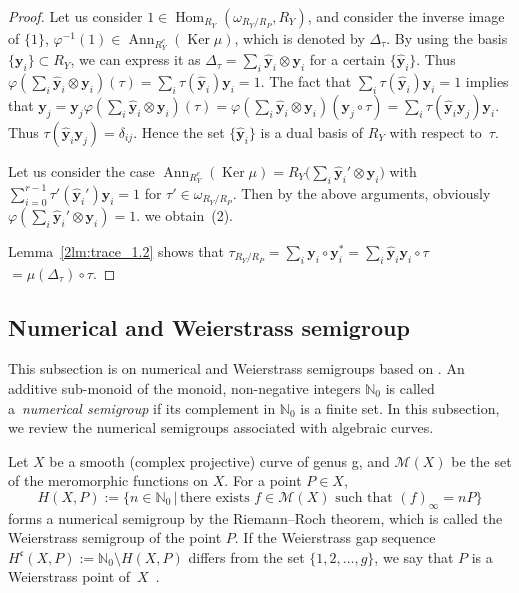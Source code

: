 \documentclass[pdftex]{sigma}
\def\NN{{\mathbb N}}
\def\bby{{\mathbf y}}
\def\cM{{\mathcal M}}
\def\fc{{\mathfrak c}}
\def\hby{\widehat {{\mathbf y}}}
\def\Ker{\operatorname{Ker}}
\numberwithin{equation}{section}
\begin{document}
\begin{proof}Let us consider $1 \in \operatorname{Hom}_{R_Y}(\omega_{R_Y/R_P}, R_Y)$, and consider the inverse image of $\{1\}$, $\varphi^{-1}(1)\in \operatorname{Ann}_{R_Y^e}(\Ker \mu)$, which is denoted by $\Delta_\tau$. By using the basis $\{\bby_i\} \subset R_Y$, we can express it as $\Delta_\tau=\sum_{i}\hby_i \otimes \bby_i$ for a certain $\{\hby_i\}$.
Thus $\varphi(\sum_i \hby_i \otimes \bby_i)(\tau)=\sum_i \tau(\hby_i) \bby_i=1$.
The fact that $\sum_i \tau(\hby_i) \bby_i=1$ implies that $\bby_j=\bby_j\varphi(\sum_i \hby_i \otimes \bby_i)(\tau)=\varphi(\sum_i \hby_i \otimes \bby_i)(\bby_j\circ \tau)=\sum_i \tau(\hby_i \bby_j)\bby_i$.
Thus $\tau(\hby_i \bby_j)=\delta_{i j}$.
Hence the set $\{\hby_i\}$ is a dual basis of $R_Y$ with respect to~$\tau$.

Let us consider the case $\operatorname{Ann}_{R_Y^e}(\Ker \mu)=R_Y\big(\sum_i \hby_i' \otimes \bby_i\big)$ with $\sum_{i=0}^{r-1}\tau'( \hby_i')\bby_i =1$ for ${\tau' \in \omega_{R_Y/R_P}}$. Then by the above arguments, obviously $\varphi(\sum_i \hby_i' \otimes \bby_i)=1$. we obtain~(2).

Lemma~\ref{2lm:trace_1.2} shows that $\tau_{R_Y/R_P}=\sum_i \bby_i\circ \bby_i^*=\sum_i \hby_i \bby_i\circ \tau$ $=\mu(\Delta_\tau)\circ \tau$.
\end{proof}

\subsection{Numerical and Weierstrass semigroup}\label{2sc:WSG}


This subsection is on numerical and Weierstrass semigroups based on \cite{ADGS2016, KMP13}.
An additive sub-monoid of the monoid, non-negative integers $\NN_0$ is called a~\emph{numerical semigroup} if its complement in $\NN_0$ is a finite set.
In this subsection, we review the numerical semigroups associated with algebraic curves.

Let $X$ be a smooth (complex projective) curve of genus g, and $\cM(X)$ be the set of the meromorphic functions on $X$.
For a point $P \in X$,
\[
 H(X,P):= \{n \in \NN_0\, |\, \text{there exists } f \in \cM(X)
 \text{ such that } (f)_\infty = n P \}
\]
forms a numerical semigroup by the Riemann--Roch theorem, which is called the Weierstrass semigroup of the point $P$.
If the Weierstrass gap sequence $H^\fc(X,P):=\NN_0 \setminus H(X, P)$ differs from the set $\{1, 2, \dots, g\}$, we say that $P$ is a Weierstrass point of~$X$~\cite{FarkasKra}.
\end{document}
